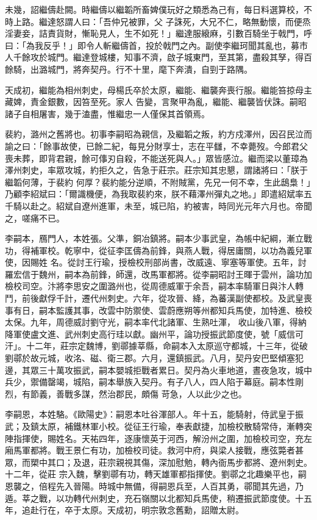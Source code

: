 \begin{pinyinscope}
 未幾，詔繼儔赴闕。時繼儔以繼韜所畜婢僕玩好之類悉為己有，每日料選算校，不時上路。繼達怒謂人曰：「吾仲兄被罪，父
 子誅死，大兄不仁，略無動懷，而便烝淫妻妾，詰責貨財，慚恥見人，生不如死！」繼達服縗麻，引數百騎坐于戟門，呼曰：「為我反乎！」即令人斬繼儔首，投於戟門之內。副使李繼珂聞其亂也，募市人千餘攻於城門。繼達登城樓，知事不濟，啟子城東門，至其第，盡殺其孥，得百餘騎，出潞城門，將奔契丹。行不十里，麾下奔潰，自剄于路隅。



 天成初，繼能為相州刺史，母楊氏卒於太原，繼能、繼襲奔喪行服。繼能笞掠母主藏婢，責金銀數，因笞至死。家人
 告變，言聚甲為亂，繼能、繼襲皆伏誅。嗣昭諸子自相屠害，幾于溘盡，惟繼忠一人僅保其首領焉。



 裴約，潞州之舊將也。初事李嗣昭為親信，及繼韜之叛，約方戍澤州，因召民泣而諭之曰：「餘事故使，已餘二紀，每見分財享士，志在平讎，不幸薨歿。今郎君父喪未葬，即背君親，餘可倳刃自殺，不能送死與人。」眾皆感泣。繼而梁以董璋為澤州刺史，率眾攻城，約拒久之，告急于莊宗。莊宗知其忠懇，謂諸將曰：「朕于繼韜何薄，于裴約
 何厚？裴約能分逆順，不附賊黨，先兄一何不幸，生此鴟梟！」乃顧李紹斌曰：「爾識機便，為我取裴約來，朕不藉澤州彈丸之地。」即遣紹斌率五千騎以赴之。紹斌自遼州進軍，未至，城已陷，約被害，時同光元年六月也。帝聞之，嗟痛不已。



 李嗣本，鴈門人，本姓張。父準，銅冶鎮將。嗣本少事武皇，為帳中紀綱，漸立戰功，得補軍校。乾寧中，從征李匡儔為前鋒，與燕人戰，得居庸關，以功為義兒軍使，因賜姓
 名。從討王行瑜，授檢校刑部尚書，改威遠、寧塞等軍使。五年，討羅宏信于魏州，嗣本為前鋒，師還，改馬軍都將。從李嗣昭討王暉于雲州，論功加檢校司空。汴將李思安之圍潞州也，從周德威軍于余吾，嗣本率騎軍日與汴人轉鬥，前後獻俘千計，遷代州刺史。六年，從攻晉、絳，為蕃漢副使都校。及武皇喪事有日，嗣本監護其事，改雲中防禦使、雲蔚應朔等州都知兵馬使，加特進、檢校太保。九年，周德威討劉守光，嗣本率代北諸軍、生熟吐渾，
 收山後八軍，得納降軍使盧文進、武州刺史高行珪以獻。幽州平，論功授振武節度使，號「威信可汗」。十二年，莊宗定魏博，劉鄩據莘縣，命嗣本入太原巡守都城，十三年，從破劉鄩於故元城，收洺、磁、衛三郡。六月，還鎮振武。八月，契丹安巴堅傾塞犯邊，其眾三十萬攻振武，嗣本嬰城拒戰者累日。契丹為火車地道，晝夜急攻，城中兵少，禦備罄竭，城陷，嗣本舉族入契丹。有子八人，四人陷于幕庭。嗣本性剛烈，有節義，善戰多謀，然治郡民，頗傷
 苛急，人以此少之也。



 李嗣恩，本姓駱。《歐陽史》：嗣恩本吐谷渾部人。年十五，能騎射，侍武皇于振武；及鎮太原，補鐵林軍小校。從征王行瑜，奉表獻捷，加檢校散騎常侍，漸轉突陣指揮使，賜姓名。天祐四年，逐康懷英于河西，解汾州之圍，加檢校司空，充左廂馬軍都將。戰王景仁有功，加檢校司徒。救河中府，與梁人接戰，應弦斃者甚眾，而槊中其口；及退，莊宗親視其傷，深加慰勉，轉內衙馬步都將、遼州刺史。十二年，從莊
 宗入魏，擊劉鄩有功，轉天雄軍都指揮使。劉鄩之北趣樂平也，嗣恩襲之，倍程先入晉陽。時城中無備，得嗣恩兵至，人百其勇，鄩聞其先過，乃遁。莘之戰，以功轉代州刺史，充石嶺關以北都知兵馬使，稍遷振武節度使。十五年，追赴行在，卒于太原。天成初，明宗敦念舊勳，詔贈太尉。




\end{pinyinscope}
